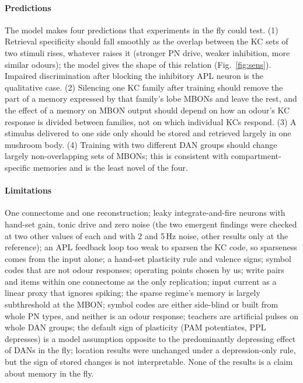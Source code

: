 \documentclass[conference]{IEEEtran}
\begin{document}
\paragraph*{Predictions}
The model makes four predictions that experiments in the fly could test.
(1) Retrieval specificity should fall smoothly as the overlap between the KC
sets of two stimuli rises, whatever raises it (stronger PN drive, weaker
inhibition, more similar odours); the model gives the shape of this relation
(Fig.~\ref{fig:sens}). Impaired discrimination after blocking the inhibitory
APL neuron \cite{lin2014} is the qualitative case. (2) Silencing one KC family
after training should remove the part of a memory expressed by that family's
lobe MBONs and leave the rest, and the effect of a memory on MBON output should
depend on how an odour's KC response is divided between families, not on
which individual KCs respond. (3) A stimulus delivered to one side only should
be stored and retrieved largely in one mushroom body. (4) Training with two
different DAN groups should change largely non-overlapping sets of MBONs; this
is consistent with compartment-specific memories \cite{aso2014a,aso2016} and is the
least novel of the four.

\paragraph*{Limitations}
One connectome and one reconstruction; leaky integrate-and-fire neurons with
hand-set gain, tonic drive and zero noise (the two emergent findings were
checked at two other values of each and with 2 and 5\,Hz noise, other results
only at the reference); an APL feedback loop too weak to sparsen the KC code,
so sparseness comes from the input alone; a hand-set plasticity rule and
valence signs; symbol codes that are not odour responses; operating points
chosen by us; write pairs and items within one connectome as the only
replication; input current as a linear proxy that ignores spiking; the sparse
regime's memory is largely subthreshold at the MBON; symbol codes are either
side-blind or built from whole PN types, and neither is an odour response;
teachers are artificial pulses on whole DAN groups; the default sign of
plasticity (PAM potentiates, PPL depresses) is a model assumption opposite to
the predominantly depressing effect of DANs in the fly; location results were unchanged under a
depression-only rule, but the sign of stored changes is not interpretable. None of the results is a claim about memory in the
fly.
\end{document}
